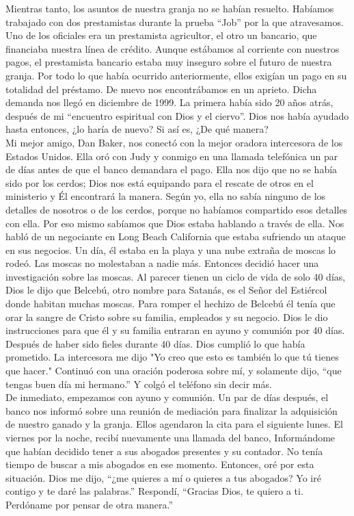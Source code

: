 \documentclass[twoside, 12pt]{book}
\begin{document}
Mientras tanto, los asuntos de nuestra granja no se habían resuelto. Habíamos trabajado con dos prestamistas durante la prueba “Job” por la que atravesamos. Uno de los oficiales era un prestamista agricultor, el otro un bancario, que financiaba nuestra línea de crédito. Aunque estábamos al corriente con nuestros pagos, el prestamista bancario estaba muy inseguro sobre el futuro de nuestra granja. Por todo lo que había ocurrido anteriormente, ellos exigían un pago en su totalidad del préstamo. De nuevo nos encontrábamos en un aprieto. Dicha demanda nos llegó en diciembre de 1999. La primera había sido 20 años atrás, después de mi “encuentro espiritual con Dios y el ciervo”. Dios nos había ayudado hasta entonces, ¿lo haría de nuevo? Si así es, ¿De qué manera?\\

Mi mejor amigo, Dan Baker, nos conectó con la mejor oradora intercesora de los Estados Unidos. Ella oró con Judy y conmigo en una llamada telefónica un par de días antes de que el banco demandara el pago. Ella nos dijo que no se había sido por los cerdos; Dios nos está equipando para el rescate de otros en el ministerio y Él encontrará la manera. Según yo, ella no sabía ninguno de los detalles de nosotros o de los cerdos, porque no habíamos compartido esos detalles con ella. Por eso mismo sabíamos que Dios estaba hablando a través de ella. 
Nos habló de un negociante en Long Beach California que estaba sufriendo un ataque en sus negocios. Un día, él estaba en la playa y una nube extraña de moscas lo rodeó. Las moscas no molestaban a nadie más. Entonces decidió hacer una investigación sobre las moscas. Al parecer tienen un ciclo de vida de solo 40 días, Dios le dijo que Belcebú, otro nombre para Satanás, es el Señor del Estiércol donde habitan muchas moscas. Para romper el hechizo de Belcebú él tenía que orar la sangre de Cristo sobre su familia, empleados y su negocio. Dios le dio instrucciones para que él y su familia entraran en ayuno y comunión por 40 días. Después de haber sido fieles durante 40 días. Dios cumplió lo que había prometido. La intercesora me dijo "Yo creo que esto es también lo que tú tienes que hacer." Continuó con una oración poderosa sobre mí, y solamente dijo, “que tengas buen día mi hermano.” Y colgó el teléfono sin decir más.\\

De inmediato, empezamos con ayuno y comunión. Un par de días después, el banco nos informó sobre una reunión de mediación para finalizar la adquisición de nuestro ganado y la granja. Ellos agendaron la cita para el siguiente lunes. El viernes por la noche, recibí nuevamente una llamada del banco, Informándome que habían decidido tener a sus abogados presentes y su contador. No tenía tiempo de buscar a mis abogados en ese momento. Entonces, oré por esta situación. Dios me dijo, “¿me quieres a mí o quieres a tus abogados? Yo iré contigo y te daré las palabras.” Respondí, “Gracias Dios, te quiero a ti. Perdóname por pensar de otra manera.”\\
\end{document}
